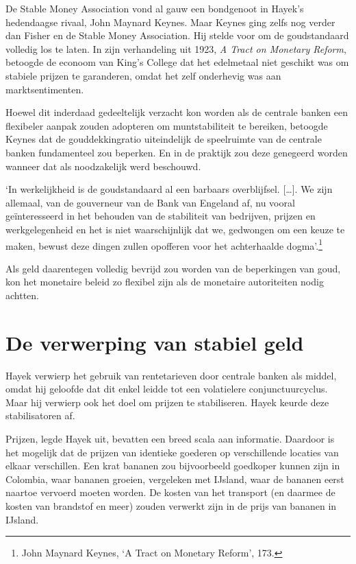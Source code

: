 \documentclass[
  a5paper,
  smalldemyvopaper,11pt,twoside,onecolumn,openright,extrafontsizes]{memoir}
\begin{document}
De Stable Money Association vond al gauw een bondgenoot in Hayek's
hedendaagse rivaal, John Maynard Keynes. Maar Keynes ging zelfs nog
verder dan Fisher en de Stable Money Association. Hij stelde voor om de
goudstandaard volledig los te laten. In zijn verhandeling uit 1923,
\emph{A Tract on Monetary Reform}, betoogde de econoom van King's
College dat het edelmetaal niet geschikt was om stabiele prijzen te
garanderen, omdat het zelf onderhevig was aan marktsentimenten.

Hoewel dit inderdaad gedeeltelijk verzacht kon worden als de centrale
banken een flexibeler aanpak zouden adopteren om muntstabiliteit te
bereiken, betoogde Keynes dat de gouddekkingratio uiteindelijk de
speelruimte van de centrale banken fundamenteel zou beperken. En in de
praktijk zou deze genegeerd worden wanneer dat als noodzakelijk werd
beschouwd.

`In werkelijkheid is de goudstandaard al een barbaars overblijfsel.
{[}\ldots{]}. We zijn allemaal, van de gouverneur van de Bank van
Engeland af, nu vooral geïnteresseerd in het behouden van de stabiliteit
van bedrijven, prijzen en werkgelegenheid en het is niet waarschijnlijk
dat we, gedwongen om een keuze te maken, bewust deze dingen zullen
opofferen voor het achterhaalde dogma'.\footnote{\hspace{0pt}John
  Maynard Keynes, `A Tract on Monetary Reform', 173.}

Als geld daarentegen volledig bevrijd zou worden van de beperkingen van
goud, kon het monetaire beleid zo flexibel zijn als de monetaire
autoriteiten nodig achtten.

\section{De verwerping van stabiel
geld}\label{de-verwerping-van-stabiel-geld}

Hayek verwierp het gebruik van rentetarieven door centrale banken als
middel, omdat hij geloofde dat dit enkel leidde tot een volatielere
conjunctuurcyclus. Maar hij verwierp ook het doel om prijzen te
stabiliseren. Hayek keurde deze stabilisatoren af.

Prijzen, legde Hayek uit, bevatten een breed scala aan informatie.
Daardoor is het mogelijk dat de prijzen van identieke goederen op
verschillende locaties van elkaar verschillen. Een krat bananen zou
bijvoorbeeld goedkoper kunnen zijn in Colombia, waar bananen groeien,
vergeleken met IJsland, waar de bananen eerst naartoe vervoerd moeten
worden. De kosten van het transport (en daarmee de kosten van brandstof
en meer) zouden verwerkt zijn in de prijs van bananen in IJsland.
\end{document}
